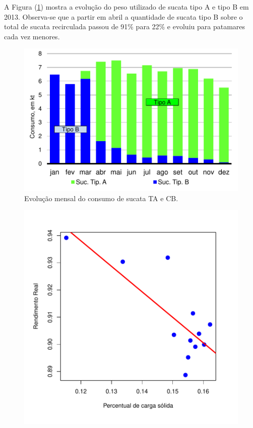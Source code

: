 \begin{multicols}{2}
	A Figura (\ref{fig:evol_tacb}) mostra a evolução do peso utilizado de sucata tipo A e tipo B em 2013. Observa-se que a partir em abril a quantidade de sucata tipo B sobre o total de sucata recirculada passou de 91\% para 22\% e evoluiu para patamares cada vez menores. 		
	\begin{figure}[H]
		\centering
		\includegraphics[scale=0.55, bb=0 0 288 432, trim=0in 0in 0in 0in]{figures/fig08-excel.pdf} %
		\caption{Evolução mensal do consumo de sucata TA e CB\cite{rel4}.}
		\label{fig:evol_tacb}
	\end{figure}					
\newpage
	\begin{figure}[H]
		\centering
		\includegraphics[scale=0.4, bb=0 0 432 432, trim=0in 0in 0in 0in]{figures/fig03.pdf} %

\end{figure}
\end{multicols}
